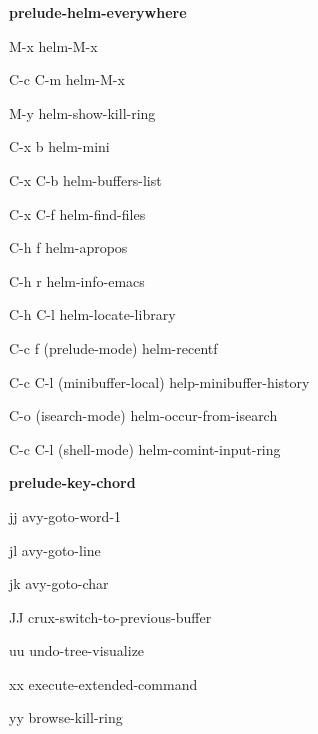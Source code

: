 \documentclass[10pt]{article}
\renewcommand\subsection[1]{\smallskip\par\textbf{\color{heading}#1}}
\begin{document}
\begin{multicols}{4}
  \subsection{prelude-helm-everywhere}
  \begin{keylist}
  \item[M-x] helm-M-x
  \item[C-c C-m] helm-M-x
  \item[M-y] helm-show-kill-ring
  \item[C-x b] helm-mini
  \item[C-x C-b] helm-buffers-list
  \item[C-x C-f] helm-find-files
  \item[C-h f] helm-apropos
  \item[C-h r] helm-info-emacs
  \item[C-h C-l] helm-locate-library
  \item[C-c f] (prelude-mode) helm-recentf
  \item[C-c C-l] (minibuffer-local)  help-minibuffer-history
  \item[C-o] (isearch-mode) helm-occur-from-isearch
  \item[C-c C-l] (shell-mode) helm-comint-input-ring
  \end{keylist}

  \subsection{prelude-key-chord}
  \begin{keylist}
  \item[jj] avy-goto-word-1
  \item[jl] avy-goto-line
  \item[jk] avy-goto-char
  \item[JJ] crux-switch-to-previous-buffer
  \item[uu] undo-tree-visualize
  \item[xx] execute-extended-command
  \item[yy] browse-kill-ring
  \end{keylist}


\end{multicols}
\end{document}
